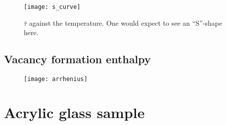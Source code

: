 \documentclass[11pt, english, fleqn, DIV=15, headinclude, BCOR=2cm]{scrreprt}
\begin{document}
\begin{figure}
    \centering
    \texttt{[image: s\_curve]}
    \caption{%
        $\bar\tau$ against the temperature. One would expect to see an
        \enquote{S}-shape here.
    }
    \label{fig:s_curve}
\end{figure}

\subsection{Vacancy formation enthalpy}

\begin{figure}
    \centering
    \texttt{[image: arrhenius]}
    \caption{%
    }
    \label{fig:arrhenius}
\end{figure}

\section{Acrylic glass sample}
\end{document}

